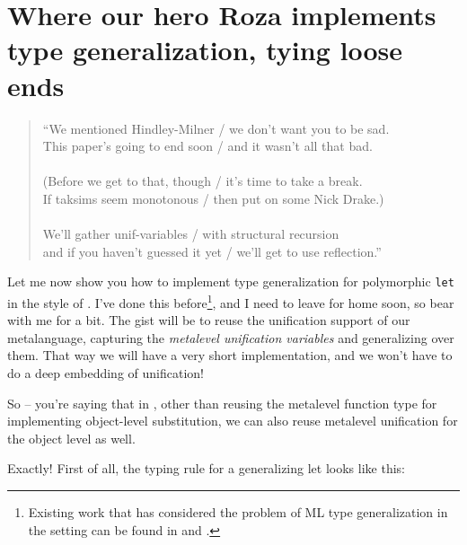\section{Where our hero Roza implements type generalization, tying loose
ends}\label{where-our-hero-roza-implements-type-generalization-tying-loose-ends}

\begin{verse}
``We mentioned Hindley-Milner / we don't want you to be sad. \\
This paper's going to end soon / and it wasn't all that bad. \\
\hspace{1em}\vspace{-0.5em} \\
(Before we get to that, though / it's time to take a break. \\
If taksims seem monotonous / then put on some Nick Drake.) \\
\hspace{1em}\vspace{-0.5em} \\
We'll gather unif-variables / with structural recursion \\
and if you haven't guessed it yet / we'll get to use reflection.''
\end{verse}

\heroADVISOR{} Let me now show you how to implement type generalization for
polymorphic \texttt{let} in the style of
\citet{damas1984type,hindley1969principal,milner1978theory}. I've done
this
before\footnote{Existing work that has considered the problem of ML type generalization
in the \lamprolog setting can be found in \citet{typgen-lamprolog-1} and \citet{typgen-lamprolog-2}.},
and I need to leave for home soon, so bear with me for a bit. The gist
will be to reuse the unification support of our metalanguage, capturing
the \emph{metalevel unification variables} and generalizing over them.
That way we will have a very short implementation, and we won't have to
do a deep embedding of unification!

\heroSTUDENT{} So -- you're saying that in \lamprolog, other than reusing the
metalevel function type for implementing object-level substitution, we
can also reuse metalevel unification for the object level as well.

\identNormal

\heroADVISOR{} Exactly! First of all, the typing rule for a generalizing let
looks like this:

\vspace{-1.2em}\begin{mathpar}
\end{mathpar}


